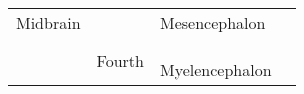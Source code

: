 \begin{table}[ht]
\begin{tabular}{l l l l}
            \multirow{4}{*}{Midbrain}
                                     & \multirow{4}{*}{\underline{\phantom{Cerebral Aqueduct}}}
                                     & \multirow{4}{*}{Mesencephalon}
                                     & \underline{\phantom{Tectum}}                                                                                             \\
                                     &                                                          &
                                     & \underline{\phantom{Tegmentum}}                                                                                          \\
                                     &                                                          &
                                     & \underline{\phantom{Superior Colliculus}}                                                                                \\
                                     &                                                          &
                                     & \underline{\phantom{Inferior Colliculus}}                                                                                \\
            \midrule

            \multirow{4}{*}{\underline{\phantom{Hindbrain}}}
                                     & \multirow{4}{*}{Fourth}
                                     & \multirow{2}{*}{\underline{\phantom{Metencephalon}}}
                                     & \underline{\phantom{Cerebellum}}                                                                                         \\
                                     &                                                          &
                                     & \underline{\phantom{Pons}}                                                                                               \\[0.5em]
            \cline{3-4}                                                                                                                                         \\[-0.5em]
                                     &                                                          & Myelencephalon
                                     & \underline{\phantom{Medulla Oblongata}}                                                                                  \\
            \bottomrule
      \end{tabular}
      \label{tab:brain-divisions}
\end{table}


